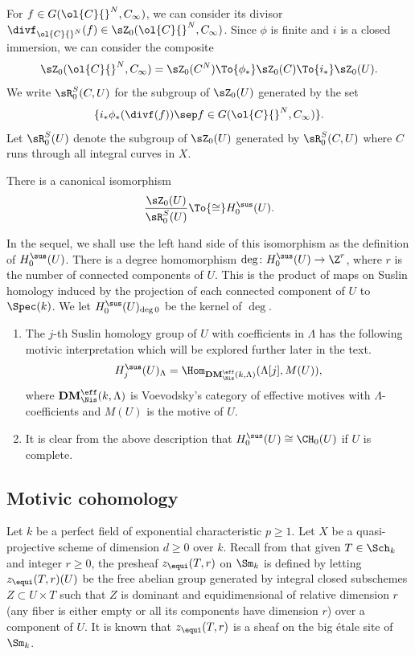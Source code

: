 For $f\in G(\ol{C}{}^N, C_\infty)$, we can consider its divisor $\divf_{\ol{C}{}^N}(f)\in \sZ_0(\ol{C}{}^N, C_\infty)$. Since $\phi$ is finite and $i$ is a closed immersion, we can consider the composite\vspace*{-3pt}
\[ \sZ_0(\ol{C}{}^N, C_\infty) = \sZ_0(C^N) \To{\phi_*} \sZ_0(C) \To{i_*} \sZ_0(U). \]
We write $\sR^{S}_0(C, U)$ for the subgroup of $\sZ_0(U)$ generated by the set
\[
\{ i_*\phi_* (\divf(f)) \sep f\in G(\ol{C}{}^N, C_\infty)\}.
\]
Let $\sR^S_0(U)$ denote the subgroup of $\sZ_0(U)$ generated by $\sR^{S}_0(C, U)$ where $C$ runs through all integral curves in $X$.

\begin{thm}\label{thm:suslinhomology}
There is a canonical isomorphism
\[
\frac{\sZ_0(U)}{\sR_0^S(U)} \To{\cong} H^{\sus}_0(U).
\]
\end{thm}

In the sequel, we shall use the left hand side of this isomorphism as the
definition of $H^{\sus}_0(U)$. There is a
degree homomorphism $\deg \colon H^{\sus}_0(U) \to \Z^r$, where
$r$ is the number of connected components of $U$. This is the product of
maps on Suslin homology induced by the projection of each connected
component of $U$ to $\Spec(k)$. We let
$H^{\sus}_0(U)_{\deg 0}$ be the kernel of $\deg$.

\skpt
\begin{remk}\label{remk:mot-homology-DM}
\begin{enumerate}
\item
The $j$-th Suslin homology group of $U$ with coefficients in $\Lambda$
has the following motivic interpretation which will be explored further later in the
text.
\[ H_j^{\sus}(U)_{\Lambda} = \Hom_{\mathbf{DM}^{\eff}_{\Nis}(k, \Lambda)}(\Lambda[j], M(U)),
\]
where $\mathbf{DM}^{\eff}_{\Nis}(k, \Lambda)$ is Voevodsky's category of effective
motives with $\Lambda$-coefficients and $M(U)$ is the motive
of $U$.

\item
It is clear from the above description that
$H_0^{\sus}(U) \cong \CH_0(U)$ if $U$ is complete.
\end{enumerate}
\end{remk}

\subsection{Motivic cohomology}
\label{sec:LW-mot-coh}Let $k$ be a perfect
field of exponential characteristic $p \ge 1$.
Let $X$ be a quasi-projective scheme of dimension $d \ge 0$ over $k$.
Recall from \cite[Lect.\,16]{MVW} that given $T \in \Sch_k$ and integer
$r \ge 0$, the presheaf $z_{\equi}(T,r)$ on $\Sm_k$ is defined by
letting $z_{\equi}(T,r)(U)$ be the free abelian group generated by
integral closed subschemes $Z \subset U \times T$ such that $Z$ is dominant and
equidimensional of relative dimension $r$ (any fiber is either empty or all
its components have dimension $r$) over a component of $U$.
It is known that $z_{\equi}(T,r)$ is a sheaf on the big étale site of $\Sm_k$.

